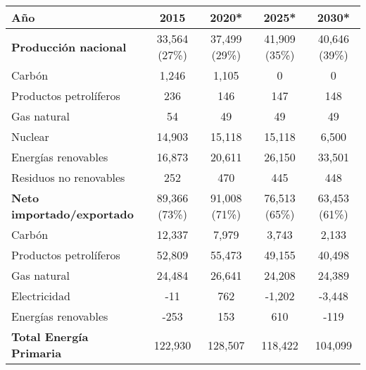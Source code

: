 \begin{itemize}
						\begin{center}
							\begin{table}[htbp]
								\centering
								\begin{tabular}{lcccc}
									\toprule
									Año & 2015 & 2020* & 2025* & 2030* \\
									\midrule
									\textbf{Producción nacional} & 33,564 (27\%) & 37,499 (29\%) & 41,909 (35\%) & 40,646 (39\%) \\
									Carbón & 1,246 & 1,105 & 0 & 0 \\
									Productos petrolíferos & 236 & 146 & 147 & 148 \\
									Gas natural & 54 & 49 & 49 & 49 \\
									Nuclear & 14,903 & 15,118 & 15,118 & 6,500 \\
									Energías renovables & 16,873 & 20,611 & 26,150 & 33,501 \\
									Residuos no renovables & 252 & 470 & 445 & 448 \\
									\midrule
									\textbf{Neto importado/exportado} & 89,366 (73\%) & 91,008 (71\%) & 76,513 (65\%) & 63,453 (61\%) \\
									Carbón & 12,337 & 7,979 & 3,743 & 2,133 \\
									Productos petrolíferos & 52,809 & 55,473 & 49,155 & 40,498 \\
									Gas natural & 24,484 & 26,641 & 24,208 & 24,389 \\
									Electricidad & -11 & 762 & -1,202 & -3,448 \\
									Energías renovables & -253 & 153 & 610 & -119 \\
									\textbf{Total Energía Primaria} & 122,930 & 128,507 & 118,422 & 104,099 \\
									\bottomrule
								\end{tabular}
							\end{table}
						\end{center}
				\end{itemize}
				

